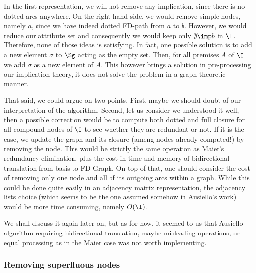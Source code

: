 \begin{figure}[ht]
		
\end{figure}

\vspace{1.2em}

In the first representation, we will not remove any implication, since there
is no dotted arcs anywhere. On the right-hand side, we would remove simple
nodes, namely $a$, since we have indeed dotted FD-path from $a$ to $b$.
However, we would reduce our attribute set and consequently we would keep only
$\emptyset \imp b$ in $\I$. Therefore, none of those ideas is satisfying. In fact, one possible solution is to add a new element $\sigma$ to $\Sg$ acting
as the empty set. Then, for all premises $A$ of $\I$ we add $\sigma$ as a new
element of $A$. This however brings a solution in pre-processing our implication
theory, it does not solve the problem in a graph theoretic manner.

\vspace{1.2em}

That said, we could argue on two points. First, maybe we should doubt of our
interpretation of the algorithm. Second, let us consider we understood it well,
then a possible correction would be to compute both dotted and full closure for
all compound nodes of $\I$ to see whether they are redundant or not. If it is the case, we update the graph and its closure (among nodes already computed!) by removing the node. This would be strictly the same operation as Maier's redundancy elimination, plus the cost in time and memory of bidirectional translation from basis to FD-Graph. On top of that, one should consider the cost of removing only one node and all of its outgoing arcs within a graph. While this could be done quite easily in an adjacency matrix representation, the adjacency lists choice (which seems to be the one assumed somehow in Ausiello's work) would be more time consuming, namely $O(\I)$. 

\vspace{1.2em}

We shall discuss it again later on, but as for now, it seemed to us that  Ausiello algorithm requiring bidirectional translation, maybe misleading operations, or equal processing as in the Maier case was not worth implementing.


\subsubsection{Removing superfluous nodes}

